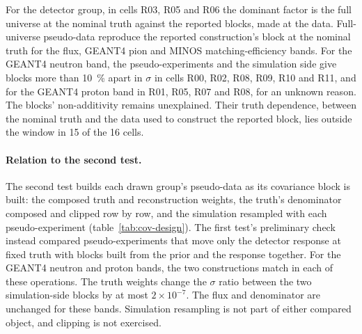 For the detector group, in cells R03, R05 and R06 the dominant factor is the full universe at the nominal truth against the reported blocks, made at the data. Full-universe pseudo-data reproduce the reported construction's block at the nominal truth for the flux, GEANT4 pion and MINOS matching-efficiency bands. For the GEANT4 neutron band, the pseudo-experiments and the simulation side give blocks more than \SI{10}{\percent} apart in $\sigma$ in cells R00, R02, R08, R09, R10 and R11, and for the GEANT4 proton band in R01, R05, R07 and R08, for an unknown reason. The blocks' non-additivity remains unexplained. Their truth dependence, between the nominal truth and the data used to construct the reported block, lies outside the window in 15 of the 16 cells.

\paragraph{Relation to the second test.} The second test builds each drawn group's pseudo-data as its covariance block is built: the composed truth and reconstruction weights, the truth's denominator composed and clipped row by row, and the simulation resampled with each pseudo-experiment (table~\ref{tab:cov-design}). The first test's preliminary check instead compared pseudo-experiments that move only the detector response at fixed truth with blocks built from the prior and the response together. For the GEANT4 neutron and proton bands, the two constructions match in each of these operations. The truth weights change the $\sigma$ ratio between the two simulation-side blocks by at most $2\times10^{-7}$. The flux and denominator are unchanged for these bands. Simulation resampling is not part of either compared object, and clipping is not exercised.

